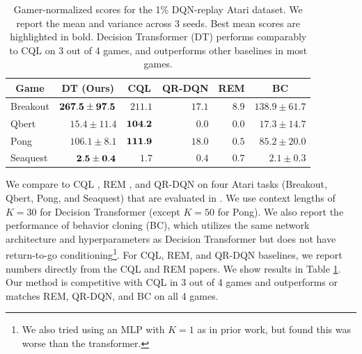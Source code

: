\begin{table}[h]
\centering
\small
\begin{tabular}{lrrrrr}
\toprule
\multicolumn{1}{c}{\bf Game} & \multicolumn{1}{c}{\bf DT (Ours)} & \multicolumn{1}{c}{\bf CQL} & \multicolumn{1}{c}{\bf QR-DQN} & \multicolumn{1}{c}{\bf REM} & \multicolumn{1}{c}{\bf BC} \\ %
\midrule
Breakout  & $\bf{267.5} \pm 97.5$ & $211.1$ & $17.1$ & $8.9$ & $138.9 \pm 61.7$ \\ %
Qbert     & $15.4 \pm 11.4$ & $\bf{104.2}$ & $0.0$ & $0.0$ & $17.3 \pm 14.7$ \\ %
Pong      & $106.1 \pm 8.1$ & $\bf{111.9}$ & $18.0$ & $0.5$ & $85.2 \pm 20.0$ \\ %
Seaquest  & $\bf{2.5} \pm 0.4$ & $1.7$ &  $0.4$ & $0.7$  & $2.1 \pm 0.3$ \\ %
\bottomrule
\end{tabular}
\caption{
Gamer-normalized scores for the 1\% DQN-replay Atari dataset.
We report the mean and variance across 3 seeds.
Best mean scores are highlighted in bold.
Decision Transformer (DT) performs comparably to CQL on 3 out of 4 games, and outperforms other baselines in most games.}
\label{tbl:atari_main}
\end{table}

We compare to CQL \citep{kumar2020conservative}, REM \citep{agarwal2020optimistic}, and QR-DQN \citep{dabney2018distributional} on four Atari tasks (Breakout, Qbert, Pong, and Seaquest) that are evaluated in \citet{agarwal2020optimistic}.
We use context lengths of $K=30$ for Decision Transformer (except $K=50$ for Pong).
We also report the performance of behavior cloning (BC), which utilizes the same network architecture and hyperparameters as Decision Transformer but does not have return-to-go conditioning\footnote{We also tried using an MLP with $K=1$ as in prior work, but found this was worse than the transformer.}.
For CQL, REM, and QR-DQN baselines, we report numbers directly from the CQL and REM papers.
We show results in Table \ref{tbl:atari_main}.
Our method is competitive with CQL in 3 out of 4 games and outperforms or matches REM, QR-DQN, and BC on all 4 games. 


